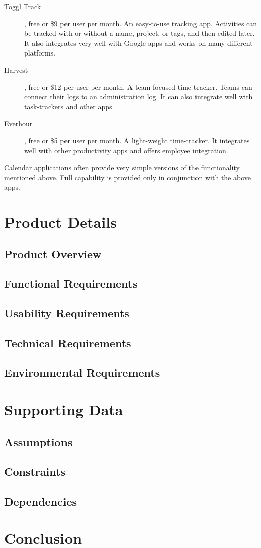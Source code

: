 \documentclass{article}
\begin{document}
\begin{description}
    \item[Toggl Track], free or \$9 per user per month.
    An easy-to-use tracking app.
    Activities can be tracked with or without a name, project, or tags, and then edited later.
    It also integrates very well with Google apps and works on many different platforms.
    \item[Harvest], free or \$12 per user per month.
    A team focused time-tracker.
    Teams can connect their logs to an administration log.
    It can also integrate well with task-trackers and other apps.
    \item[Everhour], free or \$5 per user per month.
    A light-weight time-tracker.
    It integrates well with other productivity apps and offers employee integration.
\end{description}

Calendar applications often provide very simple versions of the functionality mentioned above.
Full capability is provided only in conjunction with the above apps.

\section{Product Details}
\subsection{Product Overview}
\subsection{Functional Requirements}
\subsection{Usability Requirements}
\subsection{Technical Requirements}
\subsection{Environmental Requirements}
\section{Supporting Data}
\subsection{Assumptions}
\subsection{Constraints}
\subsection{Dependencies}
\section{Conclusion}
\end{document}
